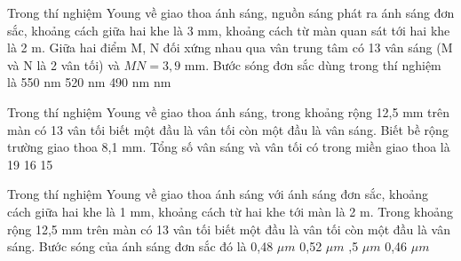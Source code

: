 \begin{ex}%
Trong thí nghiệm Young về giao thoa ánh sáng, nguồn sáng phát ra ánh sáng đơn sắc, khoảng cách giữa hai khe là 3 mm, khoảng cách từ màn quan sát tới hai khe là 2 m. Giữa hai điểm M, N đối xứng nhau qua vân trung tâm có 13 vân sáng (M và N là 2 vân tối) và $MN = 3,9$ mm. Bước sóng đơn sắc dùng trong thí nghiệm là
\choice
{550 nm}
{520 nm}
{490 nm}
{ nm}

\end{ex} 


\begin{ex}%
Trong thí nghiệm Young về giao thoa ánh sáng, trong khoảng rộng 12,5 mm trên màn có 13 vân tối biết một đầu là vân tối còn một đầu là vân sáng. Biết bề rộng trường giao thoa 8,1 mm. Tổng số vân sáng và vân tối có trong miền giao thoa là
\choice
{19}
{}
{16}
{15}

\end{ex} 
\begin{ex}%
Trong thí nghiệm Young về giao thoa ánh sáng với ánh sáng đơn sắc, khoảng cách giữa hai khe là 1 mm, khoảng cách từ hai khe tới màn là 2 m. Trong khoảng rộng 12,5 mm trên màn có 13 vân tối biết một đầu là vân tối còn một đầu là vân sáng. Bước sóng của ánh sáng đơn sắc đó là
\choice
{0,48 $\mu m $}
{0,52 $\mu m $}
{,5 $\mu m $}
{0,46 $\mu m $}
\end{ex} 

